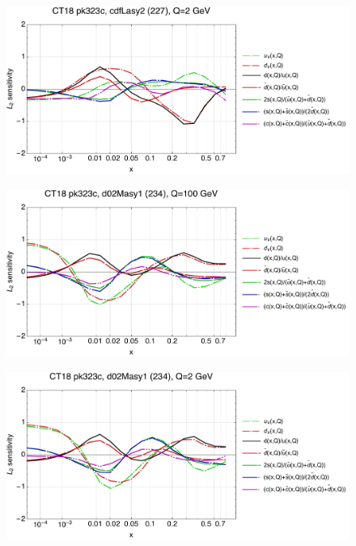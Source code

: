 \documentclass[10pt,aps,prd,floatfix,titlepage]{revtex4}
\begin{document}
\begin{figure}
\includegraphics[width=\textwidth,height=0.44\textheight,keepaspectratio]{2/227_ct18nn_q2_Sf_2.pdf}
\caption{}
\end{figure}
\clearpage
\begin{figure}
\includegraphics[width=\textwidth,height=0.44\textheight,keepaspectratio]{2/234_ct18nn_q100_Sf_2.pdf}
\caption{}
\end{figure}
\begin{figure}
\includegraphics[width=\textwidth,height=0.44\textheight,keepaspectratio]{2/234_ct18nn_q2_Sf_2.pdf}
\caption{}
\end{figure}
\end{document}
